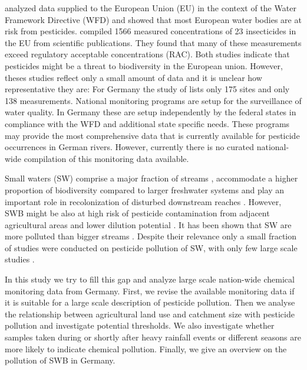 \documentclass[journal=esthag,manuscript=article]{achemso}
\begin{document}
\citet{malaj_organic_2014} analyzed data supplied to the European Union (EU) in the context of the Water Framework Directive (WFD) and showed that most European water bodies are at risk from pesticides.
\citet{stehle_pesticide_2015} compiled 1566 measured concentrations of 23 insecticides in the EU from scientific publications. 
They found that many of these measurements exceed regulatory acceptable concentrations (RAC).
Both studies indicate that pesticides might be a threat to biodiversity in the European union. 
However, theses studies reflect only a small amount of data and it is unclear how representative they are:
For Germany the study of \citet{malaj_organic_2014} lists only 175 sites and \citet{stehle_pesticide_2015} only 138 measurements. %
National monitoring programs are setup for the surveillance of water quality.
In Germany these are setup independently by the federal states in compliance with the WFD \citep{quevauviller_water_2008} and additional state specific needs. 
These programs may provide the most comprehensive data that is currently available for pesticide occurrences in German rivers.
However, currently there is no curated national-wide compilation of this monitoring data available.

Small waters (SW) comprise a major fraction of streams \citep{nadeau_hydrological_2007}, accommodate a higher proportion of biodiversity compared to larger freshwater systems \citep{davies_comparison_2008, biggs_report_2014} and play an important role in recolonization of disturbed downstream reaches \citep{liess_analyzing_2005, orlinskiy_forested_2015}.
However, SWB might be also at high risk of pesticide contamination from adjacent agricultural areas and lower dilution potential \citep{schulz_field_2004}.
It has been shown that SW are more polluted than bigger streams \citep{stehle_pesticide_2015,schulz_field_2004}.
Despite their relevance only a small fraction of studies were conducted on pesticide pollution of SW, with only few large scale studies \citep{lorenz_specifics_2016}.

In this study we try to fill this gap and analyze large scale nation-wide chemical monitoring data from Germany.
First, we revise the available monitoring data if it is suitable for a large scale description of pesticide pollution.
Then we analyse the relationship between agricultural land use and catchment size with pesticide pollution and investigate potential thresholds.
We also investigate whether samples taken during or shortly after heavy rainfall events or different seasons are more likely to indicate chemical pollution.
Finally, we give an overview on the pollution of SWB in Germany.
\end{document}
